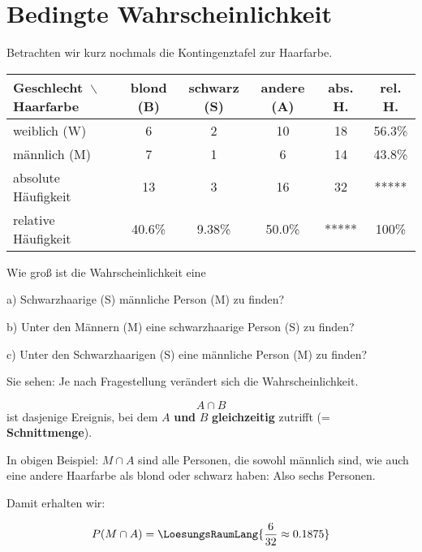 
\section{Bedingte Wahrscheinlichkeit}

Betrachten wir kurz nochmals die Kontingenztafel zur Haarfarbe.

\begin{tabular}{l|c|c|c|c|c}
Geschlecht\, $\backslash$ Haarfarbe  &  blond (B)  & schwarz (S)   & andere  (A) & abs. H.    & rel. H. \\ \hline
weiblich (W)                         &  6       & 2       & 10          &       18         & 56.3\%\\ \hline 
männlich (M)                         &  7       & 1       &  6          &       14 & 43.8\%\\ \hline
absolute Häufigkeit                  & 13       & 3       & 16          &       32 &  *****          \\ \hline
relative Häufigkeit                  & 40.6\%   & 9.38\%  & 50.0\%      &   *****  &  100\%          \\ \hline
\end{tabular}

Wie groß ist die Wahrscheinlichkeit eine

a) Schwarzhaarige (S) männliche Person (M) zu finden? 

b) Unter den Männern (M) eine schwarzhaarige Person (S) zu finden? 

c) Unter den Schwarzhaarigen (S) eine männliche Person (M) zu finden? 

Sie sehen: Je nach Fragestellung verändert sich die Wahrscheinlichkeit.


\begin{definition}{}{}
$$A\cap B$$ ist dasjenige Ereignis, bei dem $A$ \textbf{und} $B$
\textbf{gleichzeitig} zutrifft (= \textbf{Schnittmenge}).
\end{definition}

In obigen Beispiel: $M \cap A$ sind alle Personen, die sowohl
männlich sind, wie auch eine andere Haarfarbe als blond oder schwarz
haben: Also sechs Personen.

Damit erhalten wir:

$$P(M\cap A) = \LoesungsRaumLang{\frac{6}{32} \approx 0.1875}$$


